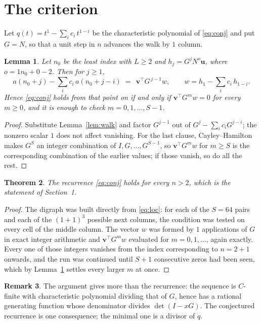 \documentclass[11pt,a4paper]{article}
\theoremstyle{plain}
\newtheorem{theorem}{Theorem}
\newtheorem{lemma}[theorem]{Lemma}
\theoremstyle{definition}
\newtheorem{remark}[theorem]{Remark}
\begin{document}
\section{The criterion}

Let $q(t)=t^{1}-\sum_i c_i\,t^{1-i}$ be the characteristic polynomial of
\eqref{eq:conj} and put $G=N$, so that a unit step in $n$ advances the walk by
$1$ column.

\begin{lemma}\label{lem:crit}
Let $n_0$ be the least index with $L\ge2$ and $h_j=G^{j}N^{o}\mathbf{u}$, where
$o=1n_0+0-2$. Then for $j\ge1$,
\[
a(n_0+j)-\sum_i c_i\,a(n_0+j-i)\;=\;\,\mathbf{v}^{\!\top}G^{\,j-1}w,
\qquad w=h_{1}-\sum_i c_i\,h_{1-i} .
\]
Hence \eqref{eq:conj} holds from that point on if and only if
$\mathbf{v}^{\!\top}G^{m}w=0$ for every $m\ge0$, and it is enough to check
$m=0,1,\dots,S-1$.
\end{lemma}

\begin{proof}
Substitute Lemma~\ref{lem:walk} and factor $G^{j-1}$ out of
$G^{j}-\sum_ic_iG^{j-i}$; the nonzero scalar $1$ does not affect
vanishing. For the last clause, Cayley--Hamilton makes $G^{S}$ an integer combination of
$I,G,\dots,G^{S-1}$, so $\mathbf{v}^{\!\top}G^{m}w$ for $m\ge S$ is the corresponding
combination of the earlier values; if those vanish, so do all the rest.
\end{proof}

\begin{theorem}
The recurrence \eqref{eq:conj} holds for every $n>2$, which is the statement of
Section~1.
\end{theorem}

\begin{proof}
The digraph was built directly from \eqref{eq:loc}: for each of the $S=64$ pairs and each
of the $(1+1)^{3}$ possible next columns, the condition was tested on every cell of
the middle column. The vector $w$ was formed by $1$ applications of $G$ in exact integer
arithmetic and $\mathbf{v}^{\!\top}G^{m}w$ evaluated for $m=0,1,\dots$, again exactly.
Every one of those integers vanishes from the index corresponding to $n=2+1$ onwards,
and the run was continued until $S+1$ consecutive zeros had been seen, which by
Lemma~\ref{lem:crit} settles every larger $m$ at once.
\end{proof}

\begin{remark}
The argument gives more than the recurrence: the sequence is $C$-finite with characteristic
polynomial dividing that of $G$, hence has a rational generating function whose denominator
divides $\det(I-xG)$. The conjectured recurrence is one consequence; the minimal one is a
divisor of $q$.
\end{remark}
\end{document}
